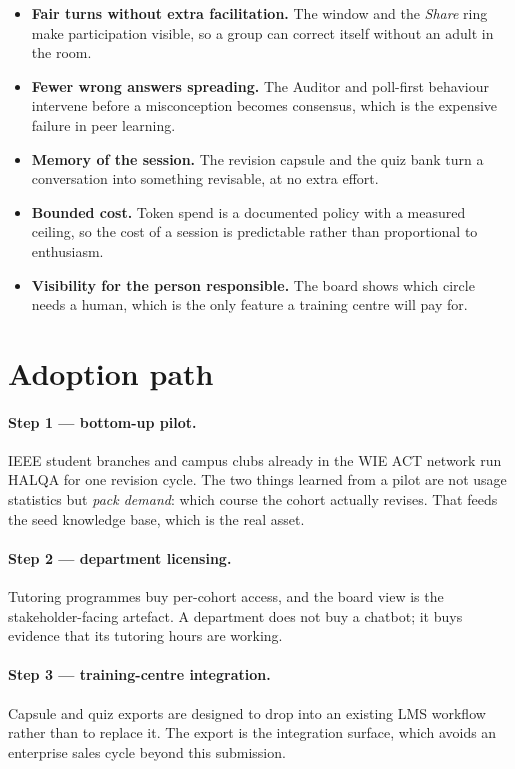 \begin{itemize}[leftmargin=1.4em,itemsep=2pt]
  \item \textbf{Fair turns without extra facilitation.} The window and the \emph{Share}
        ring make participation visible, so a group can correct itself without an adult in
        the room.
  \item \textbf{Fewer wrong answers spreading.} The Auditor and poll-first behaviour
        intervene before a misconception becomes consensus, which is the expensive failure
        in peer learning.
  \item \textbf{Memory of the session.} The revision capsule and the quiz bank turn a
        conversation into something revisable, at no extra effort.
  \item \textbf{Bounded cost.} Token spend is a documented policy with a measured ceiling,
        so the cost of a session is predictable rather than proportional to enthusiasm.
  \item \textbf{Visibility for the person responsible.} The board shows which circle needs a
        human, which is the only feature a training centre will pay for.
\end{itemize}

\section{Adoption path}

\paragraph{Step 1 --- bottom-up pilot.} IEEE student branches and campus clubs already in
the WIE ACT network run HALQA for one revision cycle. The two things learned from a pilot
are not usage statistics but \emph{pack demand}: which course the cohort actually revises.
That feeds the seed knowledge base, which is the real asset.

\paragraph{Step 2 --- department licensing.} Tutoring programmes buy per-cohort access, and
the board view is the stakeholder-facing artefact. A department does not buy a chatbot; it
buys evidence that its tutoring hours are working.

\paragraph{Step 3 --- training-centre integration.} Capsule and quiz exports are designed to
drop into an existing LMS workflow rather than to replace it. The export is the integration
surface, which avoids an enterprise sales cycle beyond this submission.

